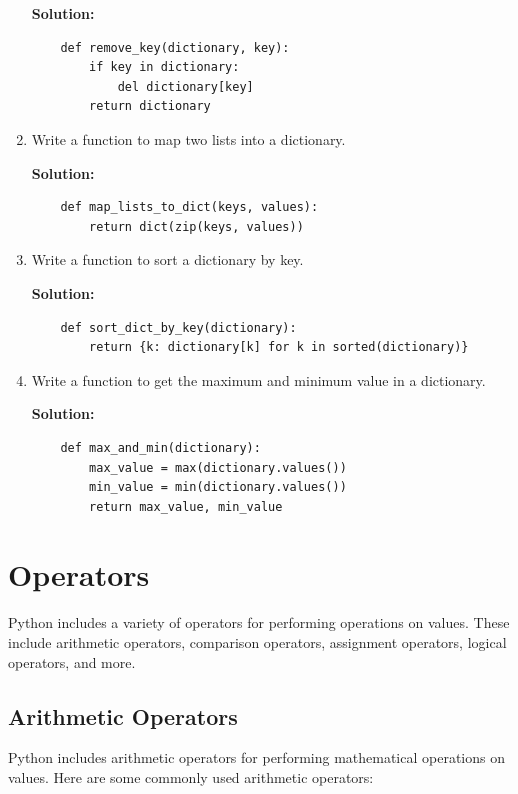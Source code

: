 \documentclass[12pt]{book}
\begin{document}
\begin{enumerate}
    \textbf{Solution:}
    \begin{lstlisting}
    def remove_key(dictionary, key):
        if key in dictionary:
            del dictionary[key]
        return dictionary
    \end{lstlisting}

    \item  Write a function to map two lists into a dictionary.

    \textbf{Solution:}
    \begin{lstlisting}
    def map_lists_to_dict(keys, values):
        return dict(zip(keys, values))
    \end{lstlisting}

    \item Write a function to sort a dictionary by key.

    \textbf{Solution:}
    \begin{lstlisting}
    def sort_dict_by_key(dictionary):
        return {k: dictionary[k] for k in sorted(dictionary)}
    \end{lstlisting}

    \item  Write a function to get the maximum and minimum value in a dictionary.

    \textbf{Solution:}
    \begin{lstlisting}
    def max_and_min(dictionary):
        max_value = max(dictionary.values())
        min_value = min(dictionary.values())
        return max_value, min_value
    \end{lstlisting}
\end{enumerate}






\newpage
\chapter{Operators}
Python includes a variety of operators for performing operations on values. These include arithmetic operators, comparison operators, assignment operators, logical operators, and more.

\section{Arithmetic Operators}

Python includes arithmetic operators for performing mathematical operations on values. Here are some commonly used arithmetic operators:
\end{document}

